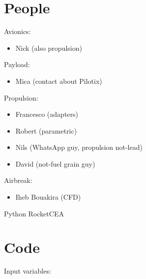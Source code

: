 \documentclass[fleqn]{article}
\date{\today}
\title{}
\begin{document}
\tableofcontents

\section{People}
\label{sec:org791fac0}

Avionics:
\begin{itemize}
\item Nick (also propulsion)
\end{itemize}

Payload:
\begin{itemize}
\item Mica (contact about Pilotix)
\end{itemize}

Propulsion:
\begin{itemize}
\item Francesco (adapters)
\item Robert (parametric)
\item Nils (WhatsApp guy, propulsion not-lead)
\item David (not-fuel grain guy)
\end{itemize}

Airbreak:
\begin{itemize}
\item Iheb Bouakira (CFD)
\end{itemize}

Python RocketCEA
\section{Code}
\label{sec:orgdc8980a}

Input variables:
\end{document}
